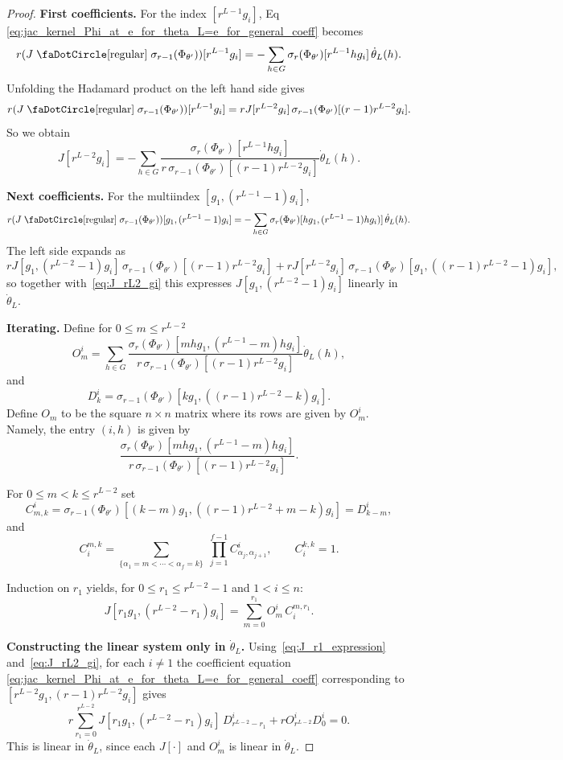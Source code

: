 \documentclass[final]{article}
\newcommand{\circbd}{\mathrel{\text{\faDotCircle[regular]}}}
\theoremstyle{definition}
\theoremstyle{plain}
\begin{document}
\begin{proof}
\medskip
\noindent\textbf{First coefficients.}
For the index $[r^{L-1}g_i]$, Eq \eqref{eq:jac_kernel_Phi_at_e_for_theta_L=e_for_general_coeff} becomes
\[
r(J\circbd\sigma_{r-1}(\Phi_{\theta'}))[r^{L-1}g_i]
=
-\sum_{h\in G}\sigma_r(\Phi_{\theta'})[r^{L-1}hg_i]\,\dot\theta_L(h).
\]
Unfolding the Hadamard product on the left hand side gives
\[
r(J\circbd\sigma_{r-1}(\Phi_{\theta'}))[r^{L-1}g_i]
=
rJ[r^{L-2}g_i]\,\sigma_{r-1}(\Phi_{\theta'})[(r-1)r^{L-2}g_i].
\]
So we obtain
\[
J[r^{L-2}g_i]
=
-\sum_{h\in G}
\frac{\sigma_r(\Phi_{\theta'})[r^{L-1}hg_i]}{
r\,\sigma_{r-1}(\Phi_{\theta'})[(r-1)r^{L-2}g_i]}
\dot\theta_L(h).
\tag{$\dagger$}
\label{eq:J_rL2_gi}
\]

\medskip
\noindent\textbf{Next coefficients.}
For the multiindex $[g_1,(r^{L-1}-1)g_i]$,
\[
r(J\circbd\sigma_{r-1}(\Phi_{\theta'}))[g_1,(r^{L-1}-1)g_i]
=
-\sum_{h\in G}
\sigma_r(\Phi_{\theta'})[hg_1,(r^{L-1}-1)hg_i)]\,\dot\theta_L(h).
\]
The left side expands as
\[
rJ[g_1,(r^{L-2}-1)g_i]\,\sigma_{r-1}(\Phi_{\theta'})[(r-1)r^{L-2}g_i]
+
rJ[r^{L-2}g_i]\,\sigma_{r-1}(\Phi_{\theta'})[g_1,((r-1)r^{L-2}-1)g_i],
\]
so together with~\eqref{eq:J_rL2_gi} this expresses
$J[g_1,(r^{L-2}-1)g_i]$ linearly in $\dot\theta_L$.

\medskip
\noindent\textbf{Iterating.}
Define for $0\le m\le r^{L-2}$
\[
O_m^i
=
\sum_{h\in G}
\frac{\sigma_r(\Phi_{\theta'})[mhg_1,(r^{L-1}-m)hg_i]}{
r\,\sigma_{r-1}(\Phi_{\theta'})[(r-1)r^{L-2}g_i]}
\dot\theta_L(h),
\]
and
\[
D_k^i
=
\sigma_{r-1}(\Phi_{\theta'})[kg_1,((r-1)r^{L-2}-k)g_i].
\]
Define $O_m$ to be the square $n\times n$ matrix where its rows are given by $O_m^i$. Namely, the entry $(i, h)$ is given by
\[
\frac{\sigma_r(\Phi_{\theta'})[mhg_1,(r^{L-1}-m)hg_i]}{
r\,\sigma_{r-1}(\Phi_{\theta'})[(r-1)r^{L-2}g_i]}.
\]

For $0\le m<k\le r^{L-2}$ set
\[
C_{m,k}^i
=
\sigma_{r-1}(\Phi_{\theta'})[(k-m)g_1,((r-1)r^{L-2}+m-k)g_i]
= D_{k-m}^i,
\]
and
\[
C_i^{m,k}
=
\sum_{\{\alpha_1=m<\cdots<\alpha_f=k\}}\;
\prod_{j=1}^{f-1} C_{\alpha_j,\alpha_{j+1}}^i,
\qquad
C_i^{k,k}=1.
\]

Induction on $r_1$ yields, for $0\le r_1\le r^{L-2}-1$ and $1<i\le n$:
\[
J[r_1g_1,(r^{L-2}-r_1)g_i]
=
\sum_{m=0}^{r_1} O_m^i\,C_i^{m,r_1}.
\tag{$\clubsuit$}\label{eq:J_r1_expression}
\]

\medskip
\noindent\textbf{Constructing the linear system only in $\dot \theta_L$.}
Using~\eqref{eq:J_r1_expression} and~\eqref{eq:J_rL2_gi}, for each $i\ne1$ the coefficient equation \eqref{eq:jac_kernel_Phi_at_e_for_theta_L=e_for_general_coeff} corresponding to $[r^{L-2}g_1,(r-1)r^{L-2}g_i]$ gives
\[
r\sum_{r_1=0}^{r^{L-2}}
J[r_1g_1,(r^{L-2}-r_1)g_i]\, D_{r^{L-2}-r_1}^i
+
rO_{r^{L-2}}^i D_0^i
=0.
\]
This is linear in $\dot\theta_L$, since each $J[\cdot]$ and $O_m^i$ is linear in $\dot\theta_L$.


\end{proof}
\end{document}
